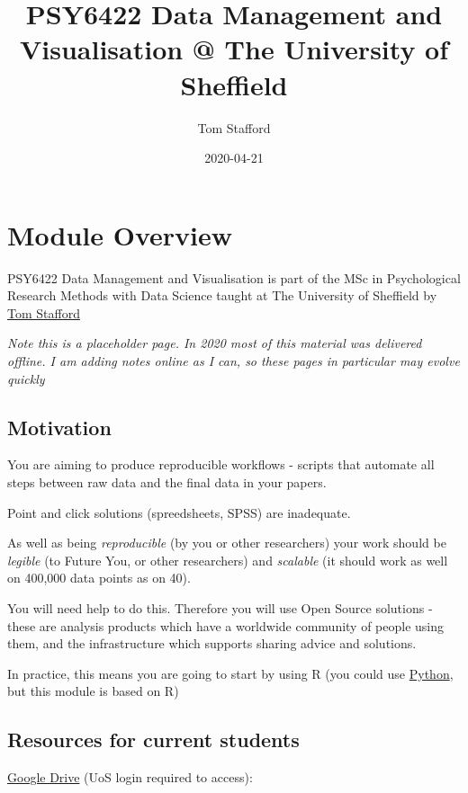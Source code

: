 \documentclass[]{book}
\title{PSY6422 Data Management and Visualisation @ The University of Sheffield}
\author{Tom Stafford}
\date{2020-04-21}
\begin{document}
\maketitle

{
\setcounter{tocdepth}{1}
\tableofcontents
}
\chapter{Module Overview}\label{module-overview}

PSY6422 Data Management and Visualisation is part of the MSc in
Psychological Research Methods with Data Science taught at The
University of Sheffield by
\href{http://tomstafford.staff.shef.ac.uk/}{Tom Stafford}

\emph{Note this is a placeholder page. In 2020 most of this material was
delivered offline. I am adding notes online as I can, so these pages in
particular may evolve quickly}

\section{Motivation}\label{motivation}

You are aiming to produce reproducible workflows - scripts that automate
all steps between raw data and the final data in your papers.

Point and click solutions (spreedsheets, SPSS) are inadequate.

As well as being \emph{reproducible} (by you or other researchers) your
work should be \emph{legible} (to Future You, or other researchers) and
\emph{scalable} (it should work as well on 400,000 data points as on
40).

You will need help to do this. Therefore you will use Open Source
solutions - these are analysis products which have a worldwide community
of people using them, and the infrastructure which supports sharing
advice and solutions.

In practice, this means you are going to start by using R (you could use
\href{https://tomstafford.github.io/psy6422/appendices.html\#python}{Python},
but this module is based on R)

\section{Resources for current
students}\label{resources-for-current-students}

\href{https://drive.google.com/drive/folders/1tuaTS6RPYOXh-XByRffFS1FDzbvvFs_w}{Google
Drive} (UoS login required to access):
\end{document}

